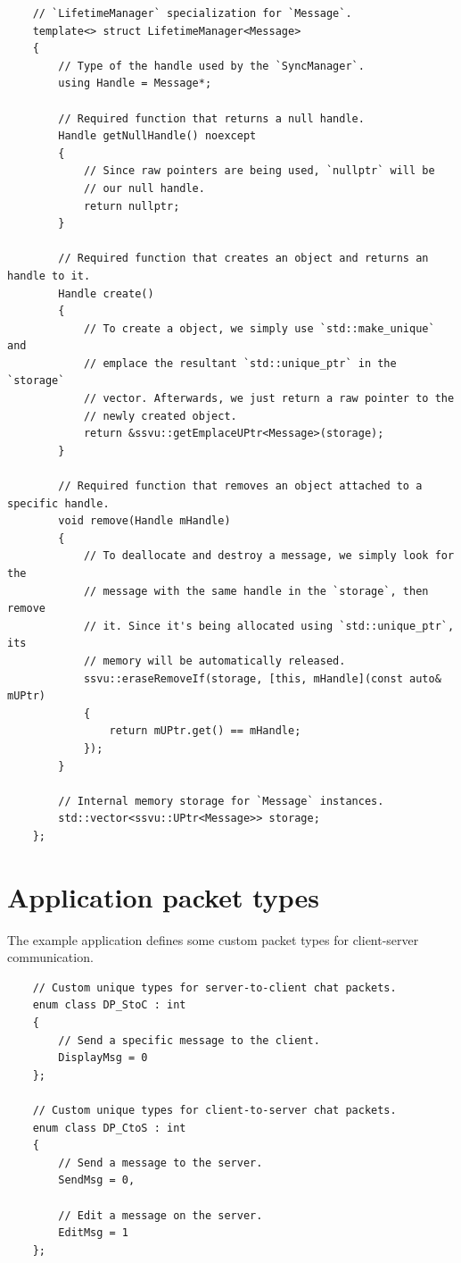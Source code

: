 \documentclass{report}
\begin{document}
\begin{verbatim}
    // `LifetimeManager` specialization for `Message`.
    template<> struct LifetimeManager<Message>
    {
        // Type of the handle used by the `SyncManager`.
        using Handle = Message*;

        // Required function that returns a null handle.
        Handle getNullHandle() noexcept 
        { 
            // Since raw pointers are being used, `nullptr` will be
            // our null handle.
            return nullptr; 
        }

        // Required function that creates an object and returns an handle to it.
        Handle create()
        {
            // To create a object, we simply use `std::make_unique` and
            // emplace the resultant `std::unique_ptr` in the `storage`
            // vector. Afterwards, we just return a raw pointer to the
            // newly created object.
            return &ssvu::getEmplaceUPtr<Message>(storage);
        }

        // Required function that removes an object attached to a specific handle.
        void remove(Handle mHandle)
        {
            // To deallocate and destroy a message, we simply look for the
            // message with the same handle in the `storage`, then remove 
            // it. Since it's being allocated using `std::unique_ptr`, its
            // memory will be automatically released.
            ssvu::eraseRemoveIf(storage, [this, mHandle](const auto& mUPtr)
            {
                return mUPtr.get() == mHandle;
            });
        }
        
        // Internal memory storage for `Message` instances.
        std::vector<ssvu::UPtr<Message>> storage;
    };
\end{verbatim}        

        \section{Application packet types}

            The example application defines some custom packet types for client-server communication.

\begin{verbatim}
    // Custom unique types for server-to-client chat packets.
    enum class DP_StoC : int
    {
        // Send a specific message to the client.
        DisplayMsg = 0
    };

    // Custom unique types for client-to-server chat packets.
    enum class DP_CtoS : int
    {
        // Send a message to the server.
        SendMsg = 0,

        // Edit a message on the server.
        EditMsg = 1
    };
\end{verbatim}        
\end{document}
